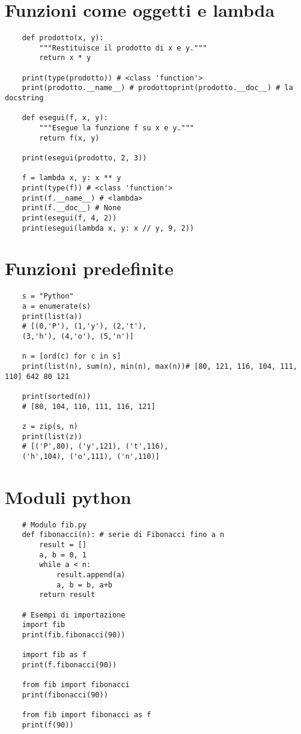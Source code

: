 \newpage

\section{Funzioni come oggetti e lambda}


\begin{lstlisting}
	def prodotto(x, y):
		"""Restituisce il prodotto di x e y."""
		return x * y
	
	print(type(prodotto)) # <class 'function'>
	print(prodotto.__name__) # prodottoprint(prodotto.__doc__) # la docstring
	
	def esegui(f, x, y):
		"""Esegue la funzione f su x e y."""
		return f(x, y)
	
	print(esegui(prodotto, 2, 3))
	
	f = lambda x, y: x ** y
	print(type(f)) # <class 'function'>
	print(f.__name__) # <lambda>
	print(f.__doc__) # None
	print(esegui(f, 4, 2))
	print(esegui(lambda x, y: x // y, 9, 2))
\end{lstlisting}

\section{Funzioni predefinite}

\begin{lstlisting}
	s = "Python"
	a = enumerate(s)
	print(list(a))
	# [(0,'P'), (1,'y'), (2,'t'),
	(3,'h'), (4,'o'), (5,'n')]
	
	n = [ord(c) for c in s]
	print(list(n), sum(n), min(n), max(n))# [80, 121, 116, 104, 111, 110] 642 80 121
	
	print(sorted(n))
	# [80, 104, 110, 111, 116, 121]
	
	z = zip(s, n)
	print(list(z))
	# [('P',80), ('y',121), ('t',116),
	('h',104), ('o',111), ('n',110)]
\end{lstlisting}

\newpage

\section{Moduli python}

\begin{lstlisting}
	# Modulo fib.py
	def fibonacci(n): # serie di Fibonacci fino a n
		result = []
		a, b = 0, 1
		while a < n:
			result.append(a)
			a, b = b, a+b
		return result
	
	# Esempi di importazione
	import fib
	print(fib.fibonacci(90))
	
	import fib as f
	print(f.fibonacci(90))
	
	from fib import fibonacci
	print(fibonacci(90))
	
	from fib import fibonacci as f
	print(f(90))
\end{lstlisting}
